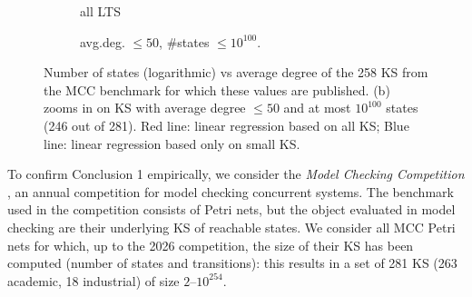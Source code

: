 \documentclass[runngingheads]{llncs}
\begin{document}
\begin{figure}[t]
    \centering
    \begin{subfigure}[b]{0.49\textwidth}
    \centering
    \caption{all LTS}
    \end{subfigure}
    \begin{subfigure}[b]{0.49\textwidth}
    \centering
    \caption{avg.deg. $\leq 50$, \#states $\leq 10^{100}$.}
    \end{subfigure}
    \caption{Number of states (logarithmic) vs average degree of the 258 KS from the MCC benchmark for which these values are published. (b) zooms in on KS with average degree $\leq 50$ and at most $10^{100}$ states (246 out of 281). Red line: linear regression based on all KS; Blue line: linear regression based only on small KS.} \label{fig:MCC}
\end{figure}


To confirm Conclusion 1 empirically, we consider the \emph{Model Checking Competition} \cite{amat2023behind}, an annual competition for model checking concurrent systems. The benchmark used in the competition consists of Petri nets, but the object evaluated in model checking are their underlying KS of reachable states. We consider all MCC Petri nets for which, up to the 2026 competition, the size of their KS has been computed (number of states and transitions): this results in a set of 281 KS (263 academic, 18 industrial) of size $2$--$10^{254}$.
\end{document}
